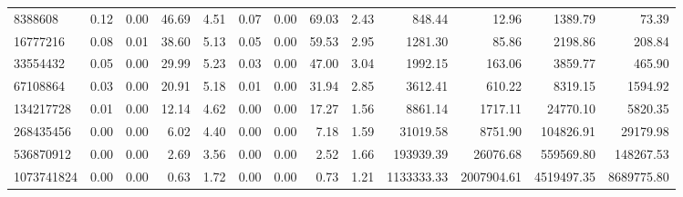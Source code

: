 \begin{tabular}{lrrrrrrrrrrrr}
8388608 & 0.12 & 0.00 & 46.69 & 4.51 & 0.07 & 0.00 & 69.03 & 2.43 & 848.44 & 12.96 & 1389.79 & 73.39 \\
16777216 & 0.08 & 0.01 & 38.60 & 5.13 & 0.05 & 0.00 & 59.53 & 2.95 & 1281.30 & 85.86 & 2198.86 & 208.84 \\
33554432 & 0.05 & 0.00 & 29.99 & 5.23 & 0.03 & 0.00 & 47.00 & 3.04 & 1992.15 & 163.06 & 3859.77 & 465.90 \\
67108864 & 0.03 & 0.00 & 20.91 & 5.18 & 0.01 & 0.00 & 31.94 & 2.85 & 3612.41 & 610.22 & 8319.15 & 1594.92 \\
134217728 & 0.01 & 0.00 & 12.14 & 4.62 & 0.00 & 0.00 & 17.27 & 1.56 & 8861.14 & 1717.11 & 24770.10 & 5820.35 \\
268435456 & 0.00 & 0.00 & 6.02 & 4.40 & 0.00 & 0.00 & 7.18 & 1.59 & 31019.58 & 8751.90 & 104826.91 & 29179.98 \\
536870912 & 0.00 & 0.00 & 2.69 & 3.56 & 0.00 & 0.00 & 2.52 & 1.66 & 193939.39 & 26076.68 & 559569.80 & 148267.53 \\
1073741824 & 0.00 & 0.00 & 0.63 & 1.72 & 0.00 & 0.00 & 0.73 & 1.21 & 1133333.33 & 2007904.61 & 4519497.35 & 8689775.80 \\
\bottomrule
\end{tabular}
